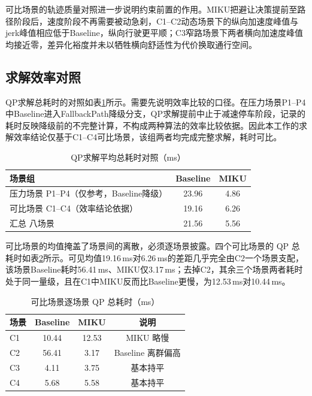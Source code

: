 \documentclass[a4paper,11pt]{ctexart}
\theoremstyle{definition}
\begin{document}
可比场景的轨迹质量对照进一步说明约束前置的作用。MIKU把避让决策提前至路径阶段后，速度阶段不再需要被动急刹，C1--C2动态场景下的纵向加速度峰值与jerk峰值相应低于Baseline，纵向行驶更平顺；C3窄路场景下两者横向加速度峰值均接近零，差异化裕度并未以牺牲横向舒适性为代价换取通行空间。

\subsection{求解效率对照}
\label{subsec:exp_qp}

QP求解总耗时的对照如表\ref{tab:exp_qp}所示。需要先说明效率比较的口径。在压力场景P1--P4中Baseline进入FallbackPath降级分支，QP求解提前中止于减速停车阶段，记录的耗时反映降级前的不完整计算，不构成两种算法的效率比较依据。因此本工作的求解效率结论仅基于C1--C4可比场景，该组两者均完成完整求解，耗时可比。

\begin{table}[htbp]
\centering
\caption{QP求解平均总耗时对照（ms）}
\label{tab:exp_qp}
\small
\begin{tabular}{lcc}
\toprule
\textbf{场景组} & \textbf{Baseline} & \textbf{MIKU} \\
\midrule
压力场景 P1--P4（仅参考，Baseline降级） & 23.96 & 4.86 \\
可比场景 C1--C4（效率结论依据） & 19.16 & 6.26 \\
\midrule
汇总 八场景 & 21.56 & 5.56 \\
\bottomrule
\end{tabular}
\end{table}

可比场景的均值掩盖了场景间的离散，必须逐场景披露。四个可比场景的 QP 总耗时如表\ref{tab:exp_qp_percomp}所示。可见均值19.16\,ms对6.26\,ms的差距几乎完全由C2一个场景支配，该场景Baseline耗时56.41\,ms、MIKU仅3.17\,ms；去掉C2，其余三个场景两者耗时处于同一量级，且在C1中MIKU反而比Baseline更慢，为12.53\,ms对10.44\,ms。

\begin{table}[htbp]
\centering
\caption{可比场景逐场景 QP 总耗时（ms）}
\label{tab:exp_qp_percomp}
\small
\begin{tabular}{lccc}
\toprule
\textbf{场景} & \textbf{Baseline} & \textbf{MIKU} & \textbf{说明} \\
\midrule
C1 & 10.44 & 12.53 & MIKU 略慢 \\
C2 & 56.41 & 3.17 & Baseline 离群偏高 \\
C3 & 4.11 & 3.75 & 基本持平 \\
C4 & 5.68 & 5.58 & 基本持平 \\
\bottomrule
\end{tabular}
\end{table}
\end{document}
